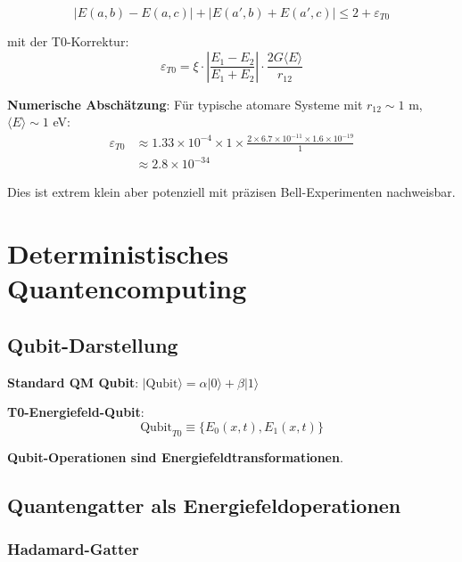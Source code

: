 \documentclass[12pt,a4paper]{article}
\newcommand{\Efield}{E}
\newcommand{\xipar}{\xi}
\begin{document}
	\begin{equation}
		\boxed{|E(a,b) - E(a,c)| + |E(a',b) + E(a',c)| \leq 2 + \varepsilon_{T0}}
	\end{equation}
	
	mit der T0-Korrektur:
	\begin{equation}
		\varepsilon_{T0} = \xipar \cdot \left|\frac{\Efield_1 - \Efield_2}{\Efield_1 + \Efield_2}\right| \cdot \frac{2G\langle E \rangle}{r_{12}}
	\end{equation}
	
	\textbf{Numerische Abschätzung}:
	Für typische atomare Systeme mit $r_{12} \sim 1$ m, $\langle E \rangle \sim 1$ eV:
	\begin{align}
		\varepsilon_{T0} &\approx 1.33 \times 10^{-4} \times 1 \times \frac{2 \times 6.7 \times 10^{-11} \times 1.6 \times 10^{-19}}{1} \\
		&\approx 2.8 \times 10^{-34}
	\end{align}
	
	Dies ist extrem klein aber potenziell mit präzisen Bell-Experimenten nachweisbar.
	
	\section{Deterministisches Quantencomputing}
	
	\subsection{Qubit-Darstellung}
	
	\textbf{Standard QM Qubit}: $|\text{Qubit}\rangle = \alpha|0\rangle + \beta|1\rangle$
	
	\textbf{T0-Energiefeld-Qubit}:
	\begin{equation}
		\boxed{\text{Qubit}_{T0} \equiv \{\Efield_0(x,t), \Efield_1(x,t)\}}
	\end{equation}
	
	\textbf{Qubit-Operationen sind Energiefeldtransformationen}.
	
	\subsection{Quantengatter als Energiefeldoperationen}
	
	\subsubsection{Hadamard-Gatter}
	
\end{document}
